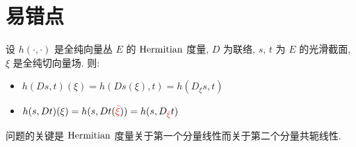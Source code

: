 \chapter{易错点}

    \begin{example}
        设 $h(\cdot,\cdot)$ 是全纯向量丛 $E$ 的 ${\rm Hermitian}$ 度量, $D$ 为联络, $s,\,t$ 为 $E$ 的光滑截面, $\xi$ 是全纯切向量场. 则:
        \begin{itemize}
            \item $h(Ds,t)(\xi) = h(Ds(\xi),t)=h(D_{\xi}s,t)$
            \item $h(s,Dt)(\xi) = h(s,Dt(\textcolor{red}{\bar{\xi}}))=h(s,D_{\textcolor{red}{\bar{\xi}}}t)$ 
        \end{itemize}
        问题的关键是 ${\rm Hermitian}$ 度量关于第一个分量线性而关于第二个分量共轭线性.
    \end{example}